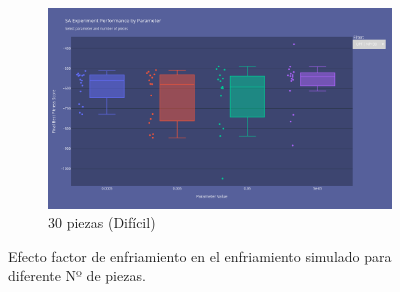 \documentclass[11pt,spanish,listoffigures,listoftables]{tfgetsinf}
\begin{document}
\begin{figure}[H]
    \begin{subfigure}[b]{0.48\textwidth}
        \centering
        \includegraphics[width=\textwidth]{images/SA_np-30_updatefactor.png}
        \caption{30 piezas (Difícil)}
        \label{fig:sa_np30_updatefactor}
    \end{subfigure}
    \caption{Efecto factor de enfriamiento en el enfriamiento simulado para diferente Nº de piezas.}
    \label{fig:sa_updatefactor}
\end{figure}


\end{document}
